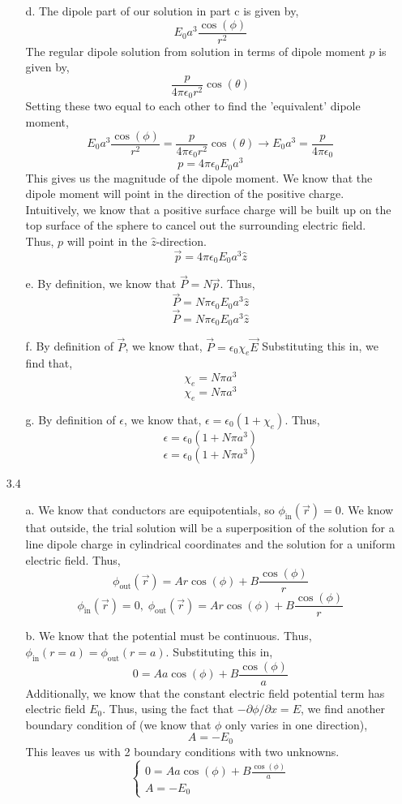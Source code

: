 \documentclass[12pt]{article}
\begin{document}
\begin{enumerate}
\begin{enumerate}
		\item [d.]
		The dipole part of our solution in part c is given by,
		\[E_0a^3\frac{\cos(\phi)}{r^2}\]
		The regular dipole solution from solution in terms of dipole moment $p$ is given by,
		\[\frac{p}{4\pi\epsilon_0r^2}\cos(\theta)\]
		Setting these two equal to each other to find the 'equivalent' dipole moment,
		\[E_0a^3\frac{\cos(\phi)}{r^2} = \frac{p}{4\pi\epsilon_0r^2}\cos(\theta)\to E_0a^3 = \frac{p}{4\pi\epsilon_0}\]
		\[p=4\pi\epsilon_0E_0a^3\]
		This gives us the magnitude of the dipole moment.
		We know that the dipole moment will point in the direction of the positive charge.
		Intuitively, we know that a positive surface charge will be built up on the top surface of the sphere to cancel out the surrounding electric field.
		Thus, $p$ will point in the $\hat z$-direction.
		\[\vec p=4\pi\epsilon_0E_0a^3\hat z\]

		\item [e.]
		By definition, we know that $\vec P = N\vec p$.
		Thus,
		\[\vec P = N\pi\epsilon_0E_0a^3 \hat z\]
		\[\boxed{\vec P = N\pi\epsilon_0E_0a^3 \hat z}\]

		\item [f.]
		By definition of $\vec P$, we know that, $\vec P = \epsilon_0\chi_e\vec E$
		Substituting this in, we find that,
		\[\chi_e = N\pi a^3\]
		\[\boxed{\chi_e = N\pi a^3}\]

		\item [g.]
		By definition of $\epsilon$, we know that, $\epsilon=\epsilon_0(1+\chi_e)$.
		Thus,
		\[\epsilon=\epsilon_0(1+N\pi a^3)\]
		\[\boxed{\epsilon=\epsilon_0(1+N\pi a^3)}\]




	\end{enumerate}

	\item [3.4]
	\begin{enumerate}
		\item [a.]
		We know that conductors are equipotentials, so $\phi_{\mathrm{in}}(\vec r)=0$.
		We know that outside, the trial solution will be a superposition of the solution for a line dipole charge in cylindrical coordinates and the solution for a uniform electric field.
		Thus,
		\[\phi_{\mathrm{out}}(\vec r)=Ar\cos(\phi)+B\frac{\cos(\phi)}{r}\]
		\[\boxed{\phi_{\mathrm{in}}(\vec r) = 0, \; \phi_{\mathrm{out}}(\vec r)=Ar\cos(\phi)+B\frac{\cos(\phi)}{r}}\]

		\item [b.]
		We know that the potential must be continuous.
		Thus, $\phi_{\mathrm{in}}(r=a)=\phi_{\mathrm{out}}(r=a)$.
		Substituting this in,
		\[0=Aa\cos(\phi)+B\frac{\cos(\phi)}{a}\]
		Additionally, we know that the constant electric field potential term has electric field $E_0$.
		Thus, using the fact that $-\partial \phi / \partial x = E$, we find another boundary condition of (we know that $\phi$ only varies in one direction),
		\[A=-E_0\]
		This leaves us with 2 boundary conditions with two unknowns.
		\[\boxed{\begin{cases}
			0=Aa\cos(\phi)+B\frac{\cos(\phi)}{a} \\
			A=-E_0	
		\end{cases}}\]


\end{enumerate}
\end{enumerate}
\end{document}
